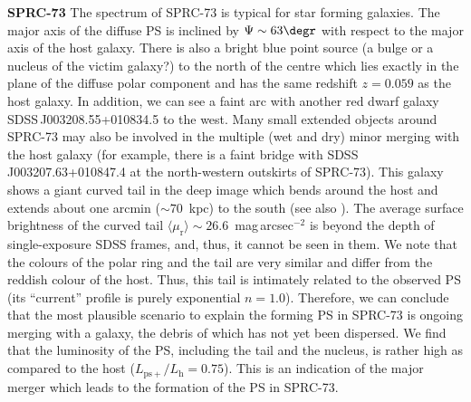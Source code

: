 \documentclass{raa}
\begin{document}
{\bf SPRC-73} 
The spectrum of SPRC-73 is typical for star forming galaxies.
The major axis of the diffuse PS is inclined by $\Psi\sim63\degr$ with respect to the major axis of the host galaxy. 
There is also a bright blue point source (a bulge or a nucleus of the victim galaxy?) to the north of the centre which lies exactly in the plane of the diffuse polar component and has the same redshift $z=0.059$ as the host galaxy. 
In addition, we can see a faint arc with another red dwarf galaxy SDSS\,J003208.55+010834.5 to the west. Many small extended objects around SPRC-73 may also be involved in the multiple (wet and dry) minor merging with the host galaxy (for example, there is a faint bridge with SDSS\,J003207.63+010847.4 at the north-western outskirts of SPRC-73).  
This galaxy shows a giant curved tail in the deep image which bends around the host and extends about one arcmin ($\sim70$~kpc) to the south (see also \citealt{fink2012}). The average surface brightness of the curved tail $\langle \mu_\mathrm{r} \rangle\sim26.6$~mag\,arcsec$^{-2}$ is beyond the depth of single-exposure SDSS frames, and, thus, it cannot be seen in them. 
We note that the colours of the polar ring and the tail are very similar and differ from the reddish colour of the host. Thus, this tail is intimately related to the observed PS (its ``current'' profile is purely exponential $n=1.0$). 
Therefore, we can conclude that the most plausible scenario to explain the forming PS in SPRC-73 is ongoing merging with a galaxy, the debris of which has not yet been dispersed. We find that the luminosity of the PS, including the tail and the nucleus, is rather high as compared to the host ($L_\mathrm{ps+}/L_\mathrm{h}=0.75$). This is an indication of the major merger which leads to the formation of the PS in SPRC-73.
\end{document}
